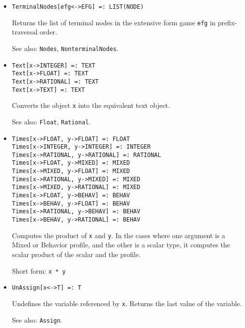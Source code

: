 \begin{itemize}

\item
\protect \large \begin{verbatim} 
TerminalNodes[efg<->EFG] =: LIST(NODE)
\end{verbatim}\normalsize

\bd
Returns the list of terminal nodes in the extensive form
game \verb+efg+ in prefix-traversal order.
\item
[See also:] {\tt Nodes}, {\tt NonterminalNodes}.
\ed

\item
\protect \large \begin{verbatim}
Text[x->INTEGER] =: TEXT
Text[x->FLOAT] =: TEXT
Text[x->RATIONAL] =: TEXT
Text[x->TEXT] =: TEXT
\end{verbatim} \normalsize

\bd
Converts the object \verb+x+ into the equivalent text object.
\item
[See also:] {\tt Float}, {\tt Rational}.
\ed

\item 
\protect \large \begin{verbatim}
Times[x->FLOAT, y->FLOAT] =: FLOAT
Times[x->INTEGER, y->INTEGER] =: INTEGER
Times[x->RATIONAL, y->RATIONAL] =: RATIONAL
Times[x->FLOAT, y->MIXED] =: MIXED
Times[x->MIXED, y->FLOAT] =: MIXED
Times[x->RATIONAL, y->MIXED] =: MIXED
Times[x->MIXED, y->RATIONAL] =: MIXED
Times[x->FLOAT, y->BEHAV] =: BEHAV
Times[x->BEHAV, y->FLOAT] =: BEHAV
Times[x->RATIONAL, y->BEHAV] =: BEHAV
Times[x->BEHAV, y->RATIONAL] =: BEHAV
\end{verbatim} \normalsize
  
\bd
Computes the product of \verb+x+ and \verb+y+.  In the cases where one
argument is a Mixed or Behavior profile, and the other is a scalar
type, it computes the scalar product of the scalar and the profile. 
\item
[Short form:] \verb+x * y+
\ed


\item
\protect \large \begin{verbatim}
UnAssign[x<->T] =: T
\end{verbatim}\normalsize

\bd
Undefines the variable referenced by \verb+x+.  Returns the
last value of the variable.
\item
[See also:] {\tt Assign}.
\ed



\end{itemize}
